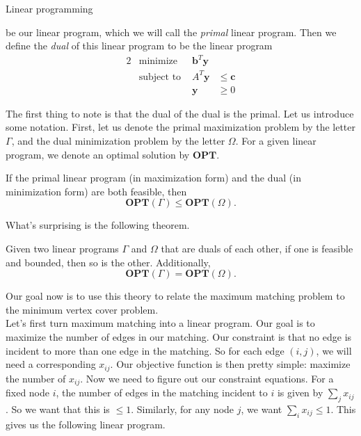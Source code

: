 \documentclass[11pt]{article}
\renewcommand{\'}{^{'}}
\newenvironment{theorem}[2][Theorem]{\begin{trivlist}
\item[\hskip \labelsep {\bfseries #1}\hskip \labelsep {\bfseries #2.}]}{\end{trivlist}}
\newenvironment{definition}[2][Definition]{\begin{trivlist}
\item[\hskip \labelsep {\bfseries #1}\hskip \labelsep {\bfseries #2.}]}{\end{trivlist}}
\begin{document}
\begin{section}{Linear programming}
\begin{definition}{(Dual)}
		be our linear program, which we will call the \emph{primal} linear program. Then we 
		define the \emph{dual} of this linear program to be the linear program
		\begin{alignat*}{2}
			& \text{minimize} & \mathbf{b}^{T}\mathbf{y} \\
			& \text{subject to } & A^{T}\mathbf{y} & \leq \mathbf{c} \\
			&& \mathbf{y} &\geq 0
		\end{alignat*}
	\end{definition}
	The first thing to note is that the dual of the dual is the primal. Let us introduce some 
	notation. First, let us denote the primal maximization problem by the letter $\Gamma$, and 
	the dual minimization problem by the letter $\Omega$. For a given linear program, we denote 
	an optimal solution by $\mathbf{OPT}$. 

	\begin{theorem}{(Weak duality)}
		If the primal linear program (in maximization form) and the dual (in minimization 
		form) are both feasible, then 
		\[
			\mathbf{OPT}(\Gamma) \leq \mathbf{OPT}(\Omega).
		\]
	\end{theorem}
	What's surprising is the following theorem.

	\begin{theorem}{(Strong duality)}
		Given two linear programs $\Gamma$ and $\Omega$ that are duals of each other, if one is 
		feasible and bounded, then so is the other. Additionally, 
		\[
			\mathbf{OPT}(\Gamma) = \mathbf{OPT}(\Omega).
		\]
	\end{theorem}
	Our goal now is to use this theory to relate the maximum matching problem to the minimum 
	vertex cover problem.\\

	Let's first turn maximum matching into a linear program. Our goal is to maximize the number 
	of edges in our matching. Our constraint is that no edge is incident to more than one edge 
	in the matching. So for each edge $(i,j)$, we will need a corresponding $x_{ij}$. Our objective 
	function is then pretty simple: maximize the number of $x_{ij}$. Now we need to figure out 
	our constraint equations. For a fixed node $i$, the number of edges in the matching incident 
	to $i$ is given by $\sum_{j} x_{ij}$. So we want that this is $\leq 1$. Similarly, for any 
	node $j$, we want $\sum_{i} x_{ij} \leq 1$. This gives us the following linear program.


\end{section}
\end{document}
